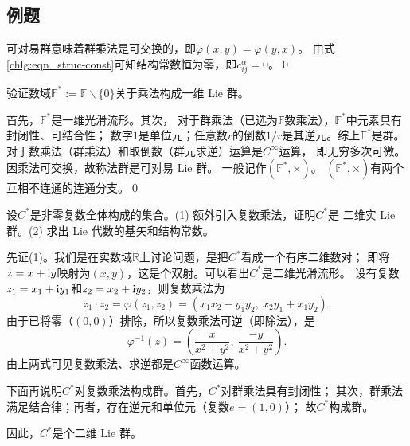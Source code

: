 \subsection{例题}
\begin{example}
可对易群意味着群乘法是可交换的，即$\varphi(x,y)=\varphi(y,x)$。
由式\eqref{chlg:eqn_struc-const}可知结构常数恒为零，即$c^\alpha_{ij}=0$。\qed
\end{example}

\begin{example}\label{chlg:exam_Ftimes}
    验证数域$\mathbb{F}^* := \mathbb{F}\backslash\{0\}$关于乘法构成一维 Lie 群。

    首先，$\mathbb{F}^*$是一维光滑流形。其次，
    对于群乘法（已选为$\mathbb{F}$数乘法），$\mathbb{F}^*$中元素具有封闭性、可结合性；
    数字$1$是单位元；任意数$r$的倒数$1/r$是其逆元。综上$\mathbb{F}^*$是群。
    对于数乘法（群乘法）和取倒数（群元求逆）运算是$C^\infty$运算，
    即无穷多次可微。因乘法可交换，故称法群是可对易 Lie 群。
    一般记作$(\mathbb{F}^*,\times)$。
    $(\mathbb{F}^*,\times)$有两个互相不连通的连通分支。\qed
\end{example}

\begin{example}
    设$C^*$是非零复数全体构成的集合。(1) 额外引入复数乘法，证明$C^*$是
    二维实 Lie 群。(2) 求出 Lie 代数的基矢和结构常数。
\end{example}
先证(1)。我们是在实数域$\mathbb{R}$上讨论问题，是把$C^*$看成一个有序二维数对；
即将$z=x+\mathrm{i} y$映射为$(x,y)$，这是个双射。可以看出$C^*$是二维光滑流形。
设有复数$z_1=x_1+\mathrm{i} y_1$和$z_2=x_2+\mathrm{i} y_2$，则复数乘法为
\begin{equation}\label{chlg:eqn_z1z2}
    z_1\cdot z_2 = \varphi(z_1,z_2)=(x_1 x_2-y_1 y_2,\ x_2 y_1+x_1 y_2).
\end{equation}
由于已将零（$(0,0)$）排除，所以复数乘法可逆（即除法），是
\begin{equation}
    \varphi^{-1}(z)=\left(\frac{x}{x^2+y^2},\ \frac{-y}{x^2+y^2}\right) .
\end{equation}
由上两式可见复数乘法、求逆都是$C^\infty$函数运算。

下面再说明$C^*$对复数乘法构成群。首先，$C^*$对群乘法具有封闭性；
其次，群乘法满足结合律；再者，存在逆元和单位元（复数$e=(1,0)$）；
故$C^*$构成群。

因此，$C^*$是个二维 Lie 群。

